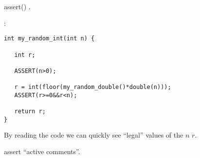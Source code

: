 assert() .

:

\begin{lstlisting}[caption=GNU Chess]
int my_random_int(int n) {

   int r;

   ASSERT(n>0);

   r = int(floor(my_random_double()*double(n)));
   ASSERT(r>=0&&r<n);

   return r;
}
\end{lstlisting}

{By reading the code we can quickly see ``legal'' values of the} $n$ \AndENRU $r$.

assert ``active comments''\cite{Lakos}.

